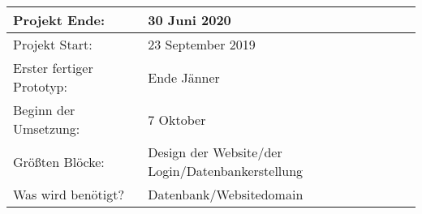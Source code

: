 \documentclass[12pt]{article}
\theoremstyle{definition}
\begin{document}
\newcommand{\projektend}{30 Juni 2020}
\newcommand{\projectstart}{23 September 2019}
\newcommand{\firstresult}{Ende Jänner}
\newcommand{\beginofprog}{7 Oktober}
\newcommand{\bigBlocks}{Design der Website/der Login/Datenbankerstellung}
\newcommand{\whatisneeded}{Datenbank/Websitedomain}

\begin{flushleft} 
\begin{tabular}{|l|l|}
\hline
Projekt Ende: & \projektend \\ \hline
Projekt Start: & \projectstart \\ \hline
Erster fertiger Prototyp: & \firstresult \\ \hline
Beginn der Umsetzung: & \beginofprog \\ \hline
Größten Blöcke: & \bigBlocks \\ \hline
Was wird benötigt? & \whatisneeded \\ \hline
\end{tabular}
\end{flushleft}
\cite{endLine}
{}

\end{document}
